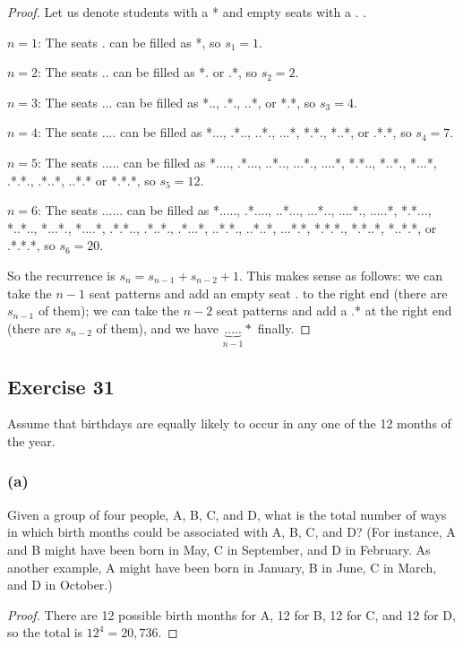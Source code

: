 \documentclass[14pt]{extarticle}
\begin{document}
\begin{proof}
Let us denote students with a * and empty seats with a . .

$n=1$: The seats . can be filled as *, so \(s_1 = 1\).

$n=2$: The seats .. can be filled as *. or .*, so \(s_2 = 2\).

$n=3$: The seats ... can be filled as *.., .*., ..*, or *.*, so \(s_3 = 4\).

$n=4$: The seats .... can be filled as *..., .*.., ..*., ...*, *.*., *..*, or .*.*, so \(s_4 = 7\).

$n=5$: The seats ..... can be filled as *...., .*..., ..*.., ...*., ....*, *.*.., *..*., *...*, .*.*., .*..*, 
..*.*  or *.*.*, so \(s_5 = 12\).

$n=6$: The seats ...... can be filled as *....., .*...., ..*..., ...*.., ....*., .....*, *.*..., *..*.., *...*., *....*, .*.*.., .*..*., .*...*, ..*.*., ..*..*, ...*.*, *.*.*., *.*..*, *..*.*, or .*.*.*, so \(s_6 = 20\).

So the recurrence is \(s_n = s_{n-1}+s_{n-2}+1\). This makes sense as follows: we can take the $n-1$ seat patterns
and add an empty seat . to the right end (there are \(s_{n-1}\) of them); we can take the $n-2$ seat patterns 
and add a .* at the right end (there are \(s_{n-2}\) of them), and we have \(\underbrace{.....}_{n-1}*\) finally.
\end{proof}

\subsection{Exercise 31}
Assume that birthdays are equally likely to occur in any one of the 12 months of the year.

\subsubsection{(a)}
Given a group of four people, A, B, C, and D, what is the total number of ways in which birth months could be 
associated with A, B, C, and D? (For instance, A and B might have been born in May, C in September, and D in 
February. As another example, A might have been born in January, B in June, C in March, and D in October.)

\begin{proof}
There are 12 possible birth months for A, 12 for B, 12 for C, and 12 for D, so the total is \(12^4 = 20,736\).
\end{proof}
\end{document}

